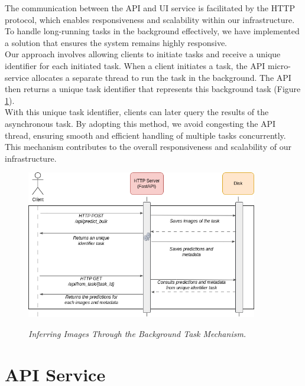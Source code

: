 The communication between the API and UI service is facilitated by the HTTP
protocol, which enables responsiveness and scalability within our
infrastructure. To handle long-running tasks in the background effectively, we
have implemented a solution that ensures the system remains highly responsive.
\\

Our approach involves allowing clients to initiate tasks and receive a unique
identifier for each initiated task. When a client initiates a task, the API
micro-service allocates a separate thread to run the task in the background.
The API then returns a unique task identifier that represents this background
task (Figure \ref{fig:backgrond-task}). \\

With this unique task identifier, clients can later query the results of the
asynchronous task. By adopting this method, we avoid congesting the API thread,
ensuring smooth and efficient handling of multiple tasks concurrently. This
mechanism contributes to the overall responsiveness and scalability of our
infrastructure.

\begin{figure}[H]
  \centering
  \includegraphics[width=0.9\textwidth]{imatges/preliminaries/BackgroundTask.drawio.png}
  \caption[Inferring Images Through the Background Task Mechanism]{\textit{Inferring Images Through the Background Task Mechanism.  }}
  {\label{fig:backgrond-task}}
\end{figure}

\newpage

\section{API Service}

